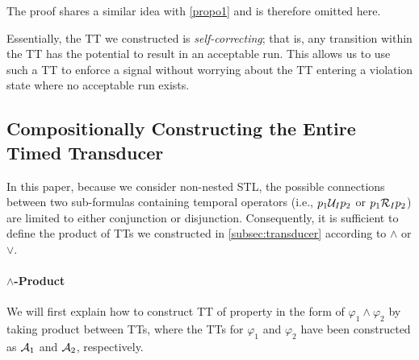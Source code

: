         The proof shares a similar idea with \cref{propo1} and is therefore omitted here.

        \begin{remark}
            Essentially, the TT we constructed is \emph{self-correcting}; that is, any transition within the TT has the potential to result in an acceptable run. This allows us to use such a TT to enforce a signal without worrying about the TT entering a violation state where no acceptable run exists.
        \end{remark}


    \subsection{Compositionally Constructing the Entire Timed Transducer}
        In this paper, because we consider non-nested STL, the possible connections between two sub-formulas containing temporal operators (i.e., \(p_1 \until_I p_2\) or \(p_1 \release_I p_2\)) are limited to either conjunction or disjunction. Consequently, it is sufficient to define the product of TTs we constructed in \cref{subsec:transducer} according to $\land$ or $\lor$.
        
        \paragraph{$\land$-Product} We will first explain how to construct TT of property in the form of $\varphi_1\land\varphi_2$ by taking product between TTs, where the TTs for $\varphi_1$ and $\varphi_2$ have been constructed as $\mathcal{A}_{1}$ and $\mathcal{A}_{2}$, respectively.
        
